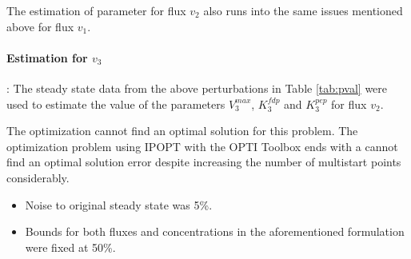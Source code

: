 \documentclass[10pt]{report}
\begin{document}
	The estimation of parameter for flux $v_2$ also runs into the same issues mentioned above for flux $v_1$.	
	
	\paragraph{Estimation for $v_3$}: The steady state data from the above perturbations in Table \ref{tab:pval} were used to estimate the value of the parameters $V_3^{max}$, $K_3^{fdp}$ and $K_3^{pep}$ for flux $v_2$. 
	
	The optimization cannot find an optimal solution for this problem. The optimization problem using IPOPT with the OPTI Toolbox  ends with a cannot find an optimal solution error despite increasing the number of multistart points considerably.
	
	\begin{itemize}
		\item Noise to original steady state was 5\%.
		\item Bounds for both fluxes and concentrations in the aforementioned formulation were fixed at 50\%.
	\end{itemize} 

	
\end{document}
